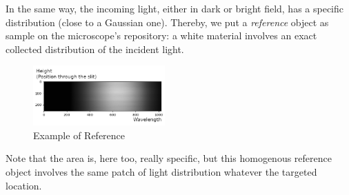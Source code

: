 \documentclass{article}
\numberwithin{equation}{section}
\begin{document}
In the same way, the incoming light, either in dark or bright field, has a specific distribution (close to a Gaussian one). Thereby, we put a \textit{reference} object as sample on the microscope's repository: a white material involves an exact collected distribution of the incident light.
\begin{figure}[h]
    \centering
    \includegraphics[width=0.45\textwidth, height=0.20\textwidth]{reference_ex.png}
    \caption{Example of Reference}
    \label{fig:reference_ex}
\end{figure}
Note that the area is, here too, really specific, but this homogenous reference object involves the same patch of light distribution whatever the targeted location.
\end{document}

